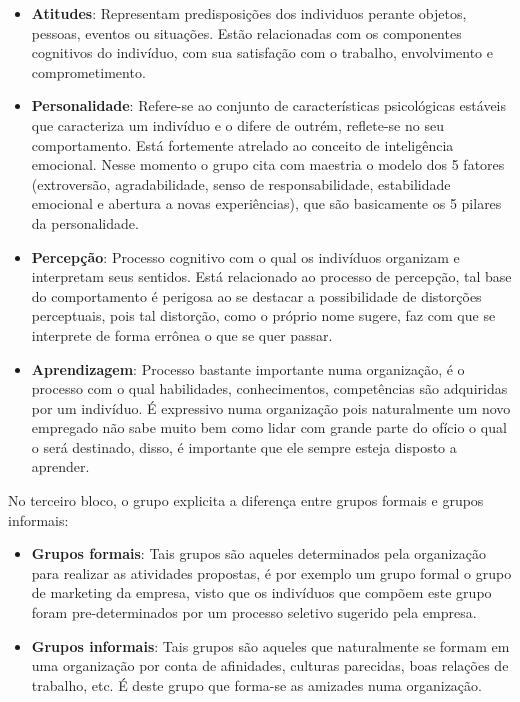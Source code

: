 \documentclass[oneside]{book}
\newcommand\tab[1][1cm]{\hspace*{#1}}
\theoremstyle{definition}
\begin{document}
        \begin{itemize}
            \item \textbf{Atitudes}: Representam predisposições dos individuos perante objetos, pessoas, eventos ou situações. Estão relacionadas com os componentes cognitivos do indivíduo, com sua satisfação com o trabalho, envolvimento e comprometimento.
            \item \textbf{Personalidade}: Refere-se ao conjunto de características psicológicas estáveis que caracteriza um indivíduo e o difere de outrém, reflete-se no seu comportamento. Está fortemente atrelado ao conceito de inteligência emocional. Nesse momento o grupo cita com maestria o modelo dos 5 fatores (extroversão, agradabilidade, senso de responsabilidade, estabilidade emocional e abertura a novas experiências), que são basicamente os 5 pilares da personalidade.
            \item \textbf{Percepção}: Processo cognitivo com o qual os indivíduos organizam e interpretam seus sentidos. Está relacionado ao processo de percepção, tal base do comportamento é perigosa ao se destacar a possibilidade de distorções perceptuais, pois tal distorção, como o próprio nome sugere, faz com que se interprete de forma errônea o que se quer passar.
            \item \textbf{Aprendizagem}: Processo bastante importante numa organização, é o processo com o qual habilidades, conhecimentos, competências são adquiridas por um indivíduo. É expressivo numa organização pois naturalmente um novo empregado não sabe muito bem como lidar com grande parte do ofício o qual o será destinado, disso, é importante que ele sempre esteja disposto a aprender.
        \end{itemize}
        \tab No terceiro bloco, o grupo explicita a diferença entre grupos formais e grupos informais:
        \begin{itemize}
            \item \textbf{Grupos formais}: Tais grupos são aqueles determinados pela organização para realizar as atividades propostas, é por exemplo um grupo formal o grupo de marketing da empresa, visto que os indivíduos que compõem este grupo foram pre-determinados por um processo seletivo sugerido pela empresa.
            \item \textbf{Grupos informais}: Tais grupos são aqueles que naturalmente se formam em uma organização por conta de afinidades, culturas parecidas, boas relações de trabalho, etc. É deste grupo que forma-se as amizades numa organização.
        \end{itemize}
\end{document}
